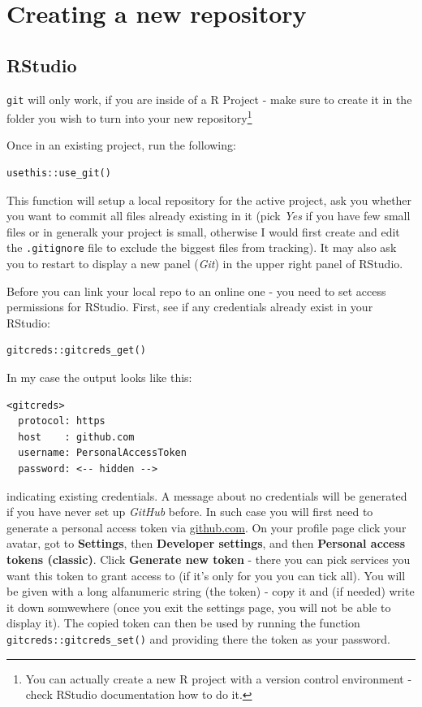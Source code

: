 \documentclass{tufte-handout}
\begin{document}
\section{Creating a new repository}

\subsection{RStudio}

\texttt{git} will only work, if you are inside of a R Project - make sure to create it in the folder you wish to turn into your new repository\footnote{You can actually create a new R project with a version control environment - check RStudio documentation how to do it.}

Once in an existing project, run the following:

\begin{verbatim}
usethis::use_git()
\end{verbatim}

This function will setup a local repository for the active project, ask you whether you want to commit all files already existing in it (pick \textit{Yes} if you have few small files or in generalk your project is small, otherwise I would first create and edit the \texttt{.gitignore} file to exclude the biggest files from tracking). It may also ask you to restart to display a new panel (\textit{Git}) in the upper right panel of RStudio.

Before you can link your local repo to an online one - you need to set access permissions for RStudio. First, see if any credentials already exist in your RStudio:

\begin{verbatim}
gitcreds::gitcreds_get()
\end{verbatim}

In my case the output looks like this:

\begin{verbatim}
<gitcreds>
  protocol: https
  host    : github.com
  username: PersonalAccessToken
  password: <-- hidden -->
\end{verbatim}

indicating existing credentials. A message about no credentials will be generated if you have never set up \textit{GitHub} before. In such case you will first need to generate a personal access token via \url{github.com}. On your profile page click your avatar, got to \textbf{Settings}, then \textbf{Developer settings}, and then \textbf{Personal access tokens (classic)}. Click \textbf{Generate new token} - there you can pick services you want this token to grant access to (if it's only for you you can tick all). You will be given with a long alfanumeric string (the token) - copy it and (if needed) write it down somwewhere (once you exit the settings page, you will not be able to display it). The copied token can then be used by running the function \texttt{gitcreds::gitcreds\_set()} and providing there the token as your password.
\end{document}
